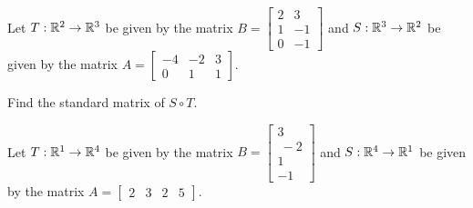\begin{applicationActivities}
%

\begin{activity}{10}
Let $T: \mathbb{R}^2 \rightarrow \mathbb{R}^3$ be given by the matrix $B=\begin{bmatrix} 2 & 3 \\ 1 & -1 \\ 0 & -1 \end{bmatrix}$ and $S: \mathbb{R}^3 \rightarrow \mathbb{R}^2$ be given by the matrix $A=\begin{bmatrix} -4 & -2 & 3 \\ 0 & 1 & 1 \end{bmatrix}$.

Find the standard matrix of $S \circ T$.
\end{activity}

%

\begin{activity}{5}
Let $T: \mathbb{R}^1 \rightarrow \mathbb{R}^4$ be given by the matrix $B=\begin{bmatrix} 3 \\\ -2 \\ 1 \\ -1\end{bmatrix}$ and $S: \mathbb{R}^4 \rightarrow \mathbb{R}^1$ be given by the matrix $A=\begin{bmatrix}2 & 3 & 2 & 5 \end{bmatrix}$.


\end{activity}
\end{applicationActivities}
